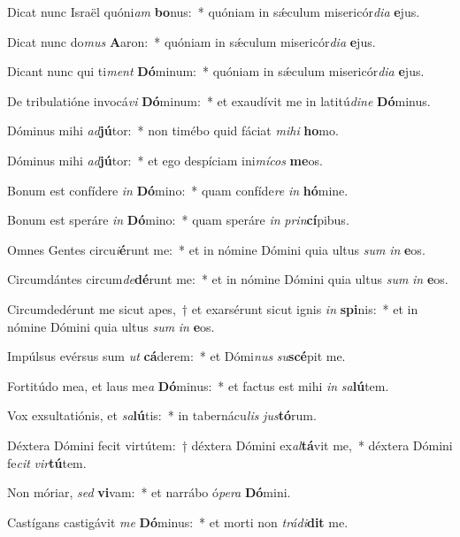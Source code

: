 \item Dicat nunc Israël quóni\textit{am} \textbf{bo}nus:~* quóniam in sǽculum misericór\textit{di}\textit{a} \textbf{e}jus.
\item Dicat nunc do\textit{mus} \textbf{A}aron:~* quóniam in sǽculum misericór\textit{di}\textit{a} \textbf{e}jus.
\item Dicant nunc qui ti\textit{ment} \textbf{Dó}minum:~* quóniam in sǽculum misericór\textit{di}\textit{a} \textbf{e}jus.
\item De tribulatióne invocá\textit{vi} \textbf{Dó}minum:~* et exaudívit me in latitú\textit{di}\textit{ne} \textbf{Dó}minus.
\item Dóminus mihi \textit{ad}\textbf{jú}tor:~* non timébo quid fáciat \textit{mi}\textit{hi} \textbf{ho}mo.
\item Dóminus mihi \textit{ad}\textbf{jú}tor:~* et ego despíciam ini\textit{mí}\textit{cos} \textbf{me}os.
\item Bonum est confídere \textit{in} \textbf{Dó}mino:~* quam confíde\textit{re} \textit{in} \textbf{hó}mine.
\item Bonum est speráre \textit{in} \textbf{Dó}mino:~* quam speráre \textit{in} \textit{prin}\textbf{cí}pibus.
\item Omnes Gentes circu\textit{i}\textbf{é}runt me:~* et in nómine Dómini quia ultus \textit{sum} \textit{in} \textbf{e}os.
\item Circumdántes circum\textit{de}\textbf{dé}runt me:~* et in nómine Dómini quia ultus \textit{sum} \textit{in} \textbf{e}os.
\item Circumdedérunt me sicut apes,~† et exarsérunt sicut ignis \textit{in} \textbf{spi}nis:~* et in nómine Dómini quia ultus \textit{sum} \textit{in} \textbf{e}os.
\item Impúlsus evérsus sum \textit{ut} \textbf{cá}derem:~* et Dómi\textit{nus} \textit{su}\textbf{scé}pit me.
\item Fortitúdo mea, et laus me\textit{a} \textbf{Dó}minus:~* et factus est mihi \textit{in} \textit{sa}\textbf{lú}tem.
\item Vox exsultatiónis, et \textit{sa}\textbf{lú}tis:~* in tabernácu\textit{lis} \textit{jus}\textbf{tó}rum.
\item Déxtera Dómini fecit virtútem:~† déxtera Dómini ex\textit{al}\textbf{tá}vit me,~* déxtera Dómini fe\textit{cit} \textit{vir}\textbf{tú}tem.
\item Non móriar, \textit{sed} \textbf{vi}vam:~* et narrábo ó\textit{pe}\textit{ra} \textbf{Dó}mini.
\item Castígans castigávit \textit{me} \textbf{Dó}minus:~* et morti non \textit{trá}\textit{di}\textbf{dit} me.
